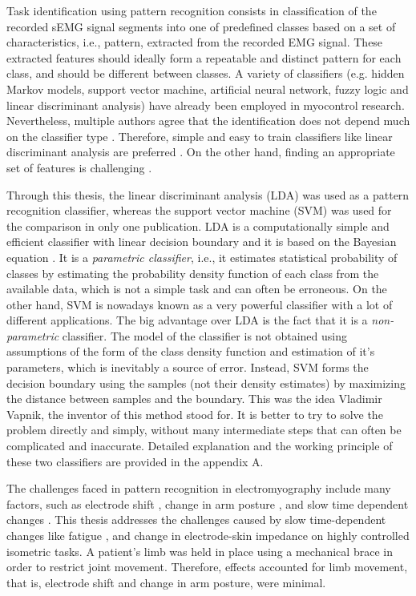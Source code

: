 Task identification using pattern recognition consists in classification of the recorded sEMG signal segments into one of predefined classes based on a set of characteristics, i.e., pattern, extracted from the recorded EMG signal. These extracted features should ideally form a repeatable and distinct pattern for each class, and should be different between classes. A variety of classifiers (e.g. hidden Markov models, support vector machine, artificial neural network, fuzzy logic and linear discriminant analysis) \citep{Oskoei2007} have already been employed in myocontrol research. Nevertheless, multiple authors agree that the identification does not depend much on the classifier type \citep{Hargrove2007, Zhang2012, Hakonen2015}. Therefore, simple and easy to train classifiers like linear discriminant analysis are preferred \citep{Li2010, Englehart1999, Tkach2010, Li2014, Hakonen2015}. On the other hand, finding an appropriate set of features is challenging \citep{Englehart1999, Tkach2010, Liu2013}.

Through this thesis, the linear discriminant analysis (LDA) was used as a pattern recognition classifier, whereas the support vector machine (SVM) was used for the comparison in only one publication. LDA is a computationally simple and efficient classifier with linear decision boundary and it is based on the Bayesian equation \citep{McLachlan2004}. It is a \emph{parametric classifier}, i.e., it estimates statistical probability of classes by estimating the probability density function of each class from the available data, which is not a simple task and can often be erroneous. On the other hand, SVM \citep{Cortes1995} is nowadays known as a very powerful classifier with a lot of different applications. The big advantage over LDA is the fact that it is a \emph{non-parametric} classifier. The model of the classifier is not obtained using assumptions of the form of the class density function and estimation of it's parameters, which is inevitably a source of error. Instead, SVM forms the decision boundary using the samples (not their density estimates) by maximizing the distance between samples and the boundary. This was the idea Vladimir Vapnik, the inventor of this method stood for. It is better to try to solve the problem directly and simply, without many intermediate steps that can often be complicated and inaccurate. Detailed explanation and the working principle of these two classifiers are provided in the appendix A.

The challenges faced in pattern recognition in electromyography include many factors, such as electrode shift \citep{Hargrove2008, Young2011}, change in arm posture \citep{Fougner2011}, and slow time dependent changes \citep{Farina2014}. This thesis addresses the challenges caused by slow time-dependent changes like fatigue \citep{Tkach2010}, and change in electrode-skin impedance \citep{Clancy2002b} on highly controlled isometric tasks. A patient's limb was held in place using a mechanical brace in order to restrict joint movement. Therefore, effects accounted for limb movement, that is, electrode shift and change in arm posture, were minimal.  


